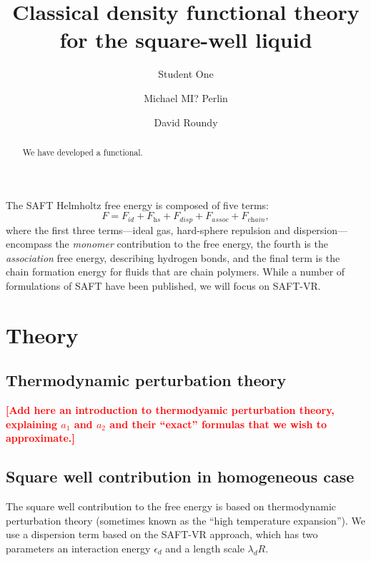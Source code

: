\documentclass[letterpaper,twocolumn,amsmath,amssymb,pre,aps,10pt]{revtex4-1}
\newcommand\fixme[1]{\textcolor{red}{\textbf{[#1]}}}
\begin{document}
\title{Classical density functional theory for the square-well liquid}

\author{Student One}
\author{Michael MI? Perlin}
\author{David Roundy}

\begin{abstract}
  We have developed a functional.
\end{abstract}

\maketitle

The SAFT Helmholtz free energy is composed of five terms:
\begin{equation} \label{eq:SAFT-free-energy}
  F = F_\textit{id} + F_\textit{hs} + F_\textit{disp} +
  F_\textit{assoc} + F_\textit{chain},
\end{equation}
where the first three terms---ideal gas, hard-sphere repulsion and
dispersion---encompass the \emph{monomer} contribution
to the free energy, the fourth is the \emph{association} free energy,
describing hydrogen bonds, and the final term is the chain formation
energy for fluids that are chain polymers.  While a
number of formulations of SAFT have been published, we will focus on
SAFT-VR\cite{gil-villegas-1997-SAFT-VR}.

\newcommand\etadisp{\ensuremath{\eta_\textit{d}}}
\newcommand\epsilondisp{\ensuremath{\epsilon_\textit{d}}}
\newcommand\lambdadisp{\ensuremath{\lambda_\textit{d}}}
\newcommand\lscale{\ensuremath{s_d}}


\section{Theory}

\subsection{Thermodynamic perturbation theory}

\fixme{Add here an introduction to thermodyamic perturbation theory,
  explaining $a_1$ and $a_2$ and their ``exact'' formulas that we wish
  to approximate.}



\subsection{Square well contribution in homogeneous case}
The square well contribution to the free energy is based on
thermodynamic perturbation theory (sometimes known as the ``high
temperature expansion'').  We use a dispersion term based on the
SAFT-VR approach\cite{gil-villegas-1997-SAFT-VR}, which has two
parameters an interaction energy $\epsilondisp$ and a length scale
$\lambdadisp R$.
\end{document}
